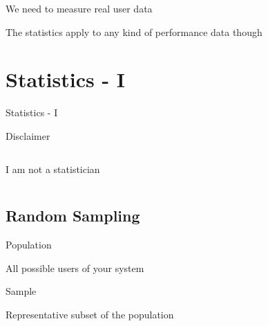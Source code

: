 \documentclass{beamer}
\begin{document}
\begin{frame}{}
\begin{center}
We need to measure real user data
\end{center}
\end{frame}

\begin{frame}{}
\begin{center}
The statistics apply to any kind of performance data though
\end{center}
\end{frame}

\section{Statistics - I}

\begin{frame}{}
  \begin{center} \LARGE{Statistics - I} \end{center}
\end{frame}

\begin{frame}{Disclaimer}
  \begin{columns}[t]
  \begin{center}
  \Large{I am not a statistician}
  \end{center}
  \end{columns}  
\end{frame}

\subsection{Random Sampling}

\begin{frame}{Population}
  \begin{block}{}
  \begin{center}
  All possible users of your system
  \end{center}
  \end{block}
  \parbox[c][0.4\paperheight]{\paperwidth}{ }
\end{frame}

\begin{frame}{Sample}
  \begin{block}{}
  \begin{center}
  Representative subset of the population
  \end{center}
  \end{block}
  \parbox[c][0.4\paperheight]{\paperwidth}{ }
\end{frame}
\end{document}
